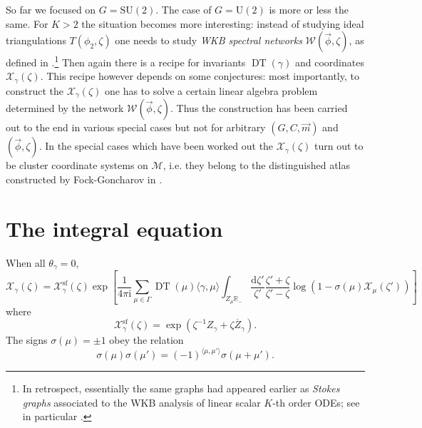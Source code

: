 \documentclass[12pt,letterpaper,reqno]{article}
\numberwithin{equation}{section}
\newcommand{\cM}{\ensuremath{\mathcal M}}
\newcommand{\cX}{\ensuremath{\mathcal X}}
\newcommand{\cW}{\ensuremath{\mathcal W}}
\newcommand{\R}{\ensuremath{\mathbb R}}
\newcommand{\I}{{\mathrm i}}
\newcommand{\de}{\mathrm{d}}
\renewcommand{\sf}{\mathrm{sf}}
\newcommand{\IP}[1]{\langle#1\rangle}
\newcommand{\vphi}{{\vec\phi}}
\newcommand{\ti}[1]{\textit{#1}}
\DeclareMathOperator{\DT}{DT}
\newcommand{\SU}{\mathrm{SU}}
\newcommand{\U}{\mathrm{U}}
\begin{document}
\begin{remark} \label{rem:higher-rank}
So far we focused on $G = \SU(2)$. The case of $G = \U(2)$ is more or
less the same. For $K>2$ the situation becomes more interesting:
instead of studying ideal triangulations $T(\phi_2, \zeta)$ 
one needs to study \ti{WKB spectral networks} $\cW(\vphi, \zeta)$, as defined in \cite{Gaiotto2012}.\footnote{In retrospect,
essentially the same graphs had appeared earlier as 
\ti{Stokes graphs} associated to the WKB analysis of
linear scalar $K$-th order ODEs; see in particular \cite{berk:988}.}
Then again there is a recipe for invariants $\DT(\gamma)$
and coordinates $\cX_\gamma(\zeta)$. This recipe however 
depends on some conjectures:
most importantly, to construct the $\cX_\gamma(\zeta)$ 
one has to solve a certain linear algebra problem determined by the 
network $\cW(\vphi,\zeta)$.
Thus the construction has been carried out to the end in various special
cases but not for arbitrary $(G,C,\vec{m})$ and $(\vphi, \zeta)$. In the special cases which have been worked out
\cite{Gaiotto:2012db,Neitzke:2017yos} the $\cX_\gamma(\zeta)$
turn out to be cluster coordinate systems on $\cM$,
i.e. they belong to the distinguished atlas constructed
by Fock-Goncharov in \cite{MR2233852}.
\end{remark}

\section{The integral equation} \label{sec:integral-equations}

\begin{conj}[Integral equation for $\theta_\gamma = 0$] \label{conj:integral-equation}
When all $\theta_\gamma = 0$,
\begin{equation} \label{eq:integral-equation}
  \cX_\gamma(\zeta) = \cX_\gamma^\sf(\zeta) \exp \left[ \frac{1}{4\pi \I} \sum_{\mu \in \Gamma} \DT(\mu) \IP{\gamma,\mu} \int_{Z_\mu \R_-} \frac{\de \zeta'}{\zeta'} \frac{\zeta' + \zeta}{\zeta'-\zeta} \log(1 - \sigma(\mu) \cX_\mu(\zeta')) \right]
\end{equation}
where 
\begin{equation}
  \cX_\gamma^\sf(\zeta) = \exp \left( \zeta^{-1} Z_\gamma + \zeta \overline{Z}_\gamma \right).
\end{equation}
The signs $\sigma(\mu) = \pm 1$ obey the relation
\begin{equation}
  \sigma(\mu) \sigma(\mu') = (-1)^{\IP{\mu,\mu'}} \sigma(\mu + \mu').
\end{equation}
\end{conj}
\end{document}
